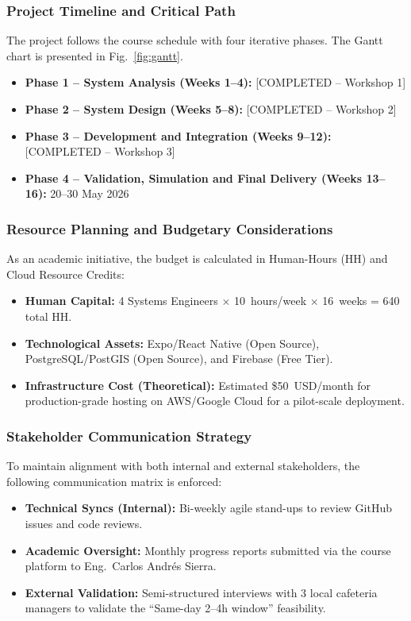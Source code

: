 \documentclass[9pt,conference]{IEEEtran}
\begin{document}
\subsubsection{Project Timeline and Critical Path}
The project follows the course schedule with four iterative phases. The Gantt chart is presented in Fig.~\ref{fig:gantt}.
\begin{itemize}
    \item \textbf{Phase 1 – System Analysis (Weeks 1–4):} [COMPLETED – Workshop 1]
    \item \textbf{Phase 2 – System Design (Weeks 5–8):} [COMPLETED – Workshop 2]
    \item \textbf{Phase 3 – Development and Integration (Weeks 9–12):} [COMPLETED – Workshop 3]
    \item \textbf{Phase 4 – Validation, Simulation and Final Delivery (Weeks 13–16):} 20--30 May 2026
\end{itemize}

\subsubsection{Resource Planning and Budgetary Considerations}

As an academic initiative, the budget is calculated in Human-Hours (HH) and Cloud Resource Credits:
\begin{itemize}
    \item \textbf{Human Capital:} 4 Systems Engineers $\times$ 10~hours/week $\times$ 16~weeks = 640 total HH.
    \item \textbf{Technological Assets:} Expo/React Native (Open Source), PostgreSQL/PostGIS (Open Source), and Firebase (Free Tier).
    \item \textbf{Infrastructure Cost (Theoretical):} Estimated \$50~USD/month for production-grade hosting on AWS/Google Cloud for a pilot-scale deployment.
\end{itemize}

\subsubsection{Stakeholder Communication Strategy}

To maintain alignment with both internal and external stakeholders, the following communication matrix is enforced:
\begin{itemize}
    \item \textbf{Technical Syncs (Internal):} Bi-weekly agile stand-ups to review GitHub issues and code reviews.
    \item \textbf{Academic Oversight:} Monthly progress reports submitted via the course platform to Eng.\ Carlos Andrés Sierra.
    \item \textbf{External Validation:} Semi-structured interviews with 3 local cafeteria managers to validate the ``Same-day 2–4h window'' feasibility.
\end{itemize}
\end{document}
